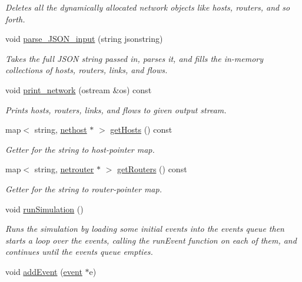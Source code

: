 \begin{DoxyCompactItemize}
\begin{DoxyCompactList}\small\item\em Deletes all the dynamically allocated network objects like hosts, routers, and so forth. \end{DoxyCompactList}\item 
void \hyperlink{classsimulation_ab9cca253149bda798b6eb13d1cf5638b}{parse\-\_\-\-J\-S\-O\-N\-\_\-input} (string jsonstring)
\begin{DoxyCompactList}\small\item\em Takes the full J\-S\-O\-N string passed in, parses it, and fills the in-\/memory collections of hosts, routers, links, and flows. \end{DoxyCompactList}\item 
void \hyperlink{classsimulation_a366ffcaf60b3a5eb1ff42f1524af2951}{print\-\_\-network} (ostream \&os) const 
\begin{DoxyCompactList}\small\item\em Prints hosts, routers, links, and flows to given output stream. \end{DoxyCompactList}\item 
map$<$ string, \hyperlink{classnethost}{nethost} $\ast$ $>$ \hyperlink{classsimulation_ac0ec3b4f06a25fed498115a7cf5eb21e}{get\-Hosts} () const 
\begin{DoxyCompactList}\small\item\em Getter for the string to host-\/pointer map. \end{DoxyCompactList}\item 
map$<$ string, \hyperlink{classnetrouter}{netrouter} $\ast$ $>$ \hyperlink{classsimulation_a1dac927fa94d498f9b8d4654abb7654a}{get\-Routers} () const 
\begin{DoxyCompactList}\small\item\em Getter for the string to router-\/pointer map. \end{DoxyCompactList}\item 
void \hyperlink{classsimulation_aeea7e33c3d6b0c480b0412ae967eef02}{run\-Simulation} ()
\begin{DoxyCompactList}\small\item\em Runs the simulation by loading some initial events into the {\ttfamily events} queue then starts a loop over the events, calling the {\ttfamily run\-Event} function on each of them, and continues until the {\ttfamily events} queue empties. \end{DoxyCompactList}\item 
void \hyperlink{classsimulation_af058039cd3a15fc654474d70ab32b73f}{add\-Event} (\hyperlink{classevent}{event} $\ast$e)

\end{DoxyCompactItemize}
